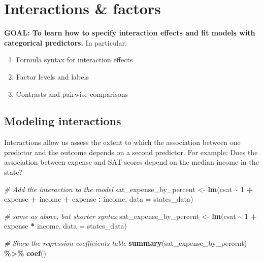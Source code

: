 \documentclass[
]{book}
\newenvironment{Shaded}{\begin{snugshade}}{\end{snugshade}}
\newcommand{\CommentTok}[1]{\textcolor[rgb]{0.56,0.35,0.01}{\textit{#1}}}
\newcommand{\DataTypeTok}[1]{\textcolor[rgb]{0.13,0.29,0.53}{#1}}
\newcommand{\DecValTok}[1]{\textcolor[rgb]{0.00,0.00,0.81}{#1}}
\newcommand{\KeywordTok}[1]{\textcolor[rgb]{0.13,0.29,0.53}{\textbf{#1}}}
\newcommand{\NormalTok}[1]{#1}
\newcommand{\OperatorTok}[1]{\textcolor[rgb]{0.81,0.36,0.00}{\textbf{#1}}}
\newcommand{\StringTok}[1]{\textcolor[rgb]{0.31,0.60,0.02}{#1}}
\providecommand{\tightlist}{%
  \setlength{\itemsep}{0pt}\setlength{\parskip}{0pt}}
\begin{document}
\hypertarget{interactions-factors}{%
\section{Interactions \& factors}\label{interactions-factors}}

\begin{alert}

\textbf{GOAL: To learn how to specify interaction effects and fit models with categorical predictors.} In particular:

\begin{enumerate}
\def\labelenumi{\arabic{enumi}.}
\tightlist
\item
  Formula syntax for interaction effects
\item
  Factor levels and labels
\item
  Contrasts and pairwise comparisons
\end{enumerate}

\end{alert}

\hypertarget{modeling-interactions}{%
\subsection{Modeling interactions}\label{modeling-interactions}}

Interactions allow us assess the extent to which the association between one predictor and the outcome depends on a second predictor. For example: Does the association between expense and SAT scores depend on the median income in the state?

\begin{Shaded}
\begin{Highlighting}[]
  \CommentTok{\# Add the interaction to the model}
\NormalTok{  sat\_expense\_by\_percent \textless{}{-}}\StringTok{ }\KeywordTok{lm}\NormalTok{(csat }\OperatorTok{\textasciitilde{}}\StringTok{ }\DecValTok{1} \OperatorTok{+}\StringTok{ }\NormalTok{expense }\OperatorTok{+}\StringTok{ }\NormalTok{income }\OperatorTok{+}\StringTok{ }\NormalTok{expense }\OperatorTok{:}\StringTok{ }\NormalTok{income, }\DataTypeTok{data =}\NormalTok{ states\_data)}

  \CommentTok{\# same as above, but shorter syntax}
\NormalTok{  sat\_expense\_by\_percent \textless{}{-}}\StringTok{ }\KeywordTok{lm}\NormalTok{(csat }\OperatorTok{\textasciitilde{}}\StringTok{ }\DecValTok{1} \OperatorTok{+}\StringTok{ }\NormalTok{expense }\OperatorTok{*}\StringTok{ }\NormalTok{income, }\DataTypeTok{data =}\NormalTok{ states\_data) }

  \CommentTok{\# Show the regression coefficients table}
  \KeywordTok{summary}\NormalTok{(sat\_expense\_by\_percent) }\OperatorTok{\%\textgreater{}\%}\StringTok{ }\KeywordTok{coef}\NormalTok{() }
\end{Highlighting}
\end{Shaded}
\end{document}
